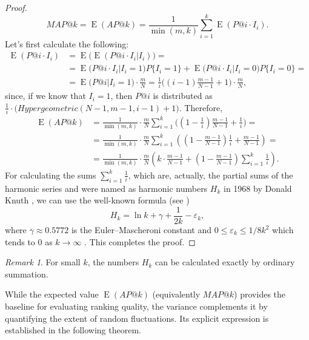 \documentclass{tpms-l}
\theoremstyle{definition}
\theoremstyle{remark}
\newtheorem{remark}[theorem]{Remark}
\numberwithin{equation}{section}
\begin{document}
\begin{proof}
$$MAP@k=\operatorname{E}(AP@k) =\frac{1}{\min (m,k)}\sum_{i=1}^k \operatorname{E}(P@i\cdot I_i).$$
Let's first calculate the following:
\begin{equation*}
\begin{split}
\operatorname{E}(P@i\cdot I_i)&=\operatorname{E}\big(\operatorname{E}(P@i\cdot I_i|I_i)\big)=\\
&=\operatorname{E}\big(P@i\cdot I_i|I_i=1\big)P\{I_i=1\}+\operatorname{E}\big(P@i\cdot I_i|I_i=0\big)P\{I_i=0\}=\\
&=\operatorname{E}\big(P@i|I_i=1\big)\cdot\frac{m}{N}=\frac{1}{i}\bigg((i-1)\frac{m-1}{N-1}+1\bigg)\cdot\frac{m}{N},
\end{split}
\end{equation*}
since, if we know that $I_i=1$, then $P@i$ is distributed as $\frac{1}{i}\cdot \big(Hypergeometric(N-1,m-1,i-1)+1\big).$ 
Therefore,
\begin{equation*}
\begin{split}\operatorname{E}(AP@k)&=\frac{1}{\min(m,k)}\cdot\frac{m}{N}\sum_{i=1}^k \bigg((1-\frac{1}{i})\frac{m-1}{N-1}+\frac{1}{i}\bigg)=\\
&=\frac{1}{\min(m,k)}\cdot\frac{m}{N}\sum_{i=1}^k \left((1-\frac{m-1}{N-1})\frac{1}{i}+\frac{m-1}{N-1} \right)=\\
&=\frac{1}{\min(m,k)}\cdot\frac{m}{N} \left(k\cdot \frac{m-1}{N-1}+(1-\frac{m-1}{N-1})\sum_{i=1}^k \frac{1}{i} \right).
\end{split}
\end{equation*}
For calculating the sums $\sum_{i=1}^k \frac{1}{i} $, which are, actually, the partial sums of the harmonic series and were named as harmonic numbers $ H_{k}$ in 1968 by Donald Knuth \cite{Knuth1968}, we can use the well-known formula (see \cite{Boas01101971})
$$
H_{k}=\ln k+\gamma +{\frac {1}{2k}}-\varepsilon _{k},
$$
where $ \gamma \approx 0.5772$ is the Euler–Mascheroni constant and 
$ 0\leq \varepsilon _{k}\leq 1/8k^{2}$  which tends to 0 as $ 
k\to \infty$ .
This completes the proof.
\end{proof}
\begin{remark}
For small $k$, the numbers $H_k$ can be calculated exactly by ordinary summation. 
\end{remark}

While the expected value $\operatorname{E}(AP@k)$ (equivalently $MAP@k$) provides the baseline for evaluating ranking quality, the variance complements it by quantifying the extent of random fluctuations. Its explicit expression is established in the following theorem.
\end{document}
